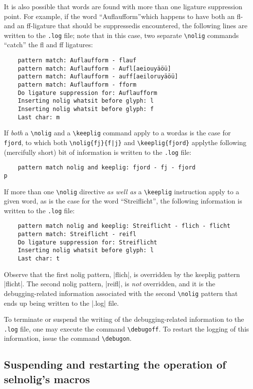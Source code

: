 \documentclass[11pt]{article}
\newcommand{\pkg}[1]{\textsf{#1}}
\newcommand{\opt}[1]{\texttt{#1}}
\newcommand{\cmmd}[1]{\texttt{\textbackslash #1}}
\begin{document}
It is also possible that words are found with more than one ligature suppression point. For example, if the word \enquote{Auflaufform}\textemdash which happens to have both an fl- and an ff-ligature that should be suppressed\textemdash is encountered, the following lines are written to the \opt{.log} file; note that in this case, two separate \cmmd{nolig} commands \enquote{catch} the fl and ff ligatures:
\begin{Verbatim}
    pattern match: Auflaufform - flauf
    pattern match: Auflaufform - Aufl[aeiouyäöü]
    pattern match: Auflaufform - auff[aeiloruyäöü]
    pattern match: Auflaufform - fform
    Do ligature suppression for: Auflaufform
    Inserting nolig whatsit before glyph: l
    Inserting nolig whatsit before glyph: f
    Last char: m
\end{Verbatim}

If \emph{both} a \cmmd{nolig} and a \cmmd{keeplig} command apply to a word\textemdash as is the case for \opt{fjord}, to which both \Verb+\nolig{fj}{f|j}+ and \Verb+\keeplig{fjord}+ apply\textemdash the following (mercifully short) bit of information is written to the \opt{.log} file:
\begin{Verbatim}
    pattern match nolig and keeplig: fjord - fj - fjord
p\end{Verbatim}

If more than one \cmmd{nolig} directive \emph{as well as} a \cmmd{keeplig} instruction apply to a given word, as is the case for the word \enquote{Streiflicht}, the following information is written to the \opt{.log} file:
\begin{Verbatim}
    pattern match nolig and keeplig: Streiflicht - flich - flicht
    pattern match: Streiflicht - reifl
    Do ligature suppression for: Streiflicht
    Inserting nolig whatsit before glyph: l
    Last char: t
    \end{Verbatim}
Observe that the first nolig pattern, |flich|, is overridden by the keeplig pattern |flicht|. The second nolig pattern, |reifl|, is \emph{not} overridden, and it is the debugging-related information associated with the second \cmmd{nolig} pattern that ends up being written to the |.log| file. 

To terminate or suspend the writing of the debugging-related information to the \opt{.log} file, one may execute the command \cmmd{debugoff}. To restart the logging of this information, issue the command \cmmd{debugon}.



\subsection[Suspending and restarting the operation of selnolig's macros]{Suspending and restarting the operation of \pkg{selnolig}'s macros}
\end{document}
